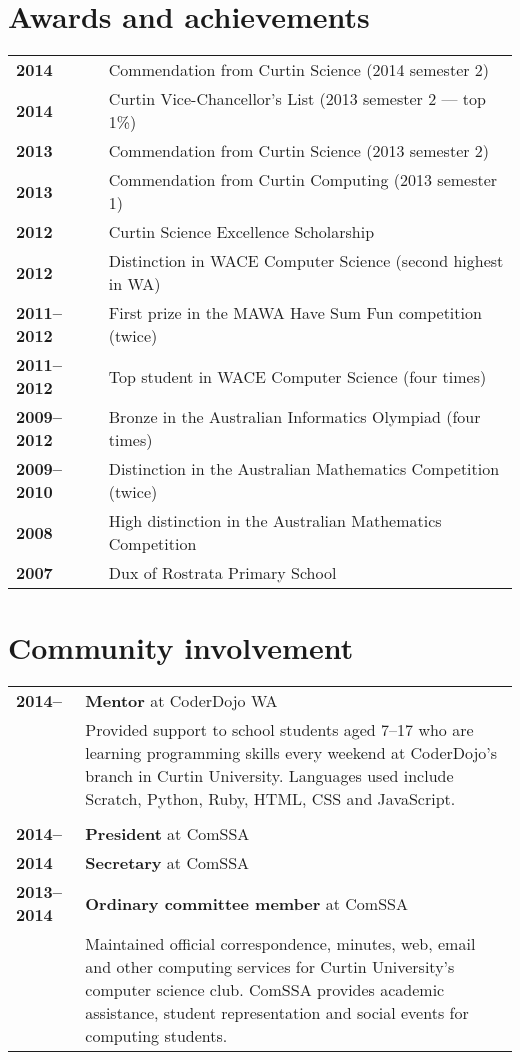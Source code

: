 \documentclass[a4paper,12pt]{article}
\begin{document}
\section*{Awards and achievements}

\begin{tabular}{p{3.5cm}p{12.5cm}}
	\textbf{2014} &
		Commendation from Curtin Science (2014 semester 2)\\
	\textbf{2014} &
		Curtin Vice-Chancellor's List (2013 semester 2 --- top 1\%)\\
	\textbf{2013} &
		Commendation from Curtin Science (2013 semester 2)\\
	\textbf{2013} &
		Commendation from Curtin Computing (2013 semester 1)\\
	\textbf{2012} &
		Curtin Science Excellence Scholarship\\
	\textbf{2012} &
		Distinction in WACE Computer Science (second highest in WA)\\
	\textbf{2011--2012} &
		First prize in the MAWA Have Sum Fun competition (twice)\\
	\textbf{2011--2012} &
		Top student in WACE Computer Science (four times)\\
	\textbf{2009--2012} &
		Bronze in the Australian Informatics Olympiad (four times)\\
	\textbf{2009--2010} &
		Distinction in the Australian Mathematics Competition (twice)\\
	\textbf{2008} &
		High distinction in the Australian Mathematics Competition\\
	\textbf{2007} &
		Dux of Rostrata Primary School
\end{tabular}

\section*{Community involvement}

\begin{tabular}{p{3.5cm}p{12.5cm}}
	\textbf{2014--} &
		\textbf{Mentor} at CoderDojo WA\\ &
		Provided support to school students aged 7--17 who are
		learning programming skills every weekend at CoderDojo's
		branch in Curtin University. Languages used include
		Scratch, Python, Ruby, HTML, CSS and JavaScript.\\\\
	\textbf{2014--} &
		\textbf{President} at ComSSA\\
	\textbf{2014} &
		\textbf{Secretary} at ComSSA\\
	\textbf{2013--2014} &
		\textbf{Ordinary committee member} at ComSSA\\ &
		Maintained official correspondence, minutes, web, email and
		other computing services for Curtin University's computer
		science club. ComSSA provides academic assistance, student
		representation and social events for computing students.
\end{tabular}
\end{document}
